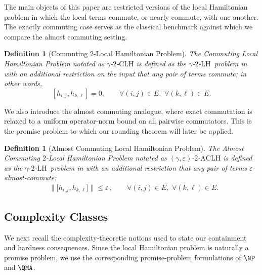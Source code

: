 \documentclass[11pt]{article}
\theoremstyle{plain}
\newtheorem{definition}[theorem]{Definition}
\newcommand{\eps}{\varepsilon}
\newcommand{\kLH}{$\gamma$-$2$-$\mathrm{LH}$}
\begin{document}
The main objects of this paper are restricted versions of the local Hamiltonian problem in which the local terms commute, or nearly commute, with one another.  The exactly commuting case serves as the classical benchmark against which we compare the almost commuting setting.

\begin{definition}[Commuting $2$-Local Hamiltonian Problem]
    The Commuting Local Hamiltonian Problem notated as $\gamma$-$2$-$\mathrm{CLH}$ is defined as the \kLH\ problem in  with an additional restriction on the input that any pair of terms commute; in other words,
    \begin{equation}
    \left[h_{i, j}, h_{k, \ell}\right] = 0, \quad\quad \forall (i, j) \in E, \,\, \forall (k, \ell) \in E.
    \end{equation}
\end{definition}

We also introduce the almost commuting analogue, where exact commutation is relaxed to a uniform operator-norm bound on all pairwise commutators.  This is the promise problem to which our rounding theorem will later be applied.

\begin{definition}[Almost Commuting Local Hamiltonian Problem]
The Almost Commuting $2$-Local Hamiltonian Problem notated as $(\gamma, \eps)$-$2$-$\mathrm{ACLH}$ is defined as the \kLH\ problem in  with an additional restriction that any pair of terms $\eps$-almost-commute:
\begin{align}
\,\,\,\, \|\big[h_{i, j}, h_{k, \ell}\big]\| \leq \eps \, , \quad\quad \forall (i, j) \in E, \,\, \forall (k, \ell) \in E.
\end{align}
\end{definition}

\subsection{Complexity Classes}

We next recall the complexity-theoretic notions used to state our containment and hardness consequences.  Since the local Hamiltonian problem is naturally a promise problem, we use the corresponding promise-problem formulations of $\NP$ and $\QMA$.
\end{document}
